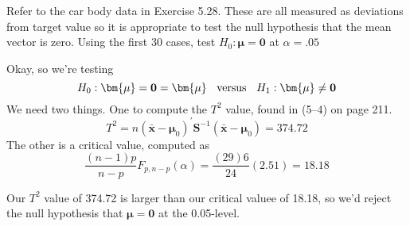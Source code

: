 Refer to the car body data in Exercise 5.28. These are all measured as deviations from
target value so it is appropriate to test the null hypothesis that the mean vector is zero.
Using the first 30 cases, test $H_{0}: \bm{\mu} = \textbf{0}$ at $\alpha = .05$
\newline
\par
Okay, so we're testing
\[
    H_{0}: \bm{\mu} = \textbf{0} = \bm{\mu}
    \hspace{0.2cm}
    \text{ versus }
    \hspace{0.2cm}
    H_{1}: \bm{\mu} \ne \textbf{0}
\]
We need two things. One to compute the $T^{2}$ value, found in (5--4) on page 211.
\[
    T^{2}
    =
    n
    {(\bar{\textbf{x}} - \bm{\mu}_{0})}^{\prime}
    \textbf{S}^{-1}
    (\bar{\textbf{x}} - \bm{\mu}_{0})
    =
    374.72
\]
The other is a critical value, computed as
\[
    \frac{(n-1)p}{n-p}
    F_{p, n-p}(\alpha)
    =
    \frac{(29)6}{24}
    (2.51)
    =
    18.18
\]

Our $T^{2}$ value of 374.72 is larger than our critical valuee of 18.18, so we'd reject the null hypothesis that $\bm{\mu} = \textbf{0}$ at the 0.05-level.